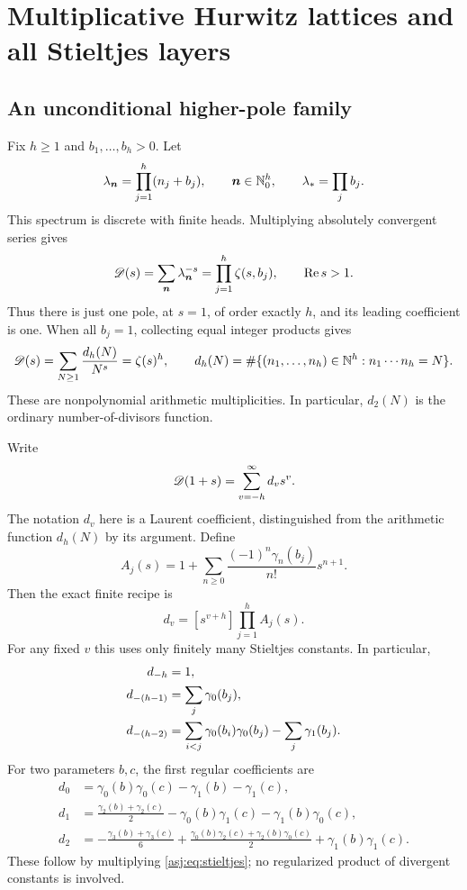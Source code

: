 \section{Multiplicative Hurwitz lattices and all Stieltjes layers}
\label{asj:sec:hurwitz}

\subsection{An unconditional higher-pole family}
Fix $h\ge1$ and $b_1,\ldots,b_h>0$. Let
\begin{equation}\label{asj:eq:lattice}
 \lambda_{\boldsymbol n}=\prod_{j=1}^h(n_j+b_j),
 \qquad \boldsymbol n\in\mathbb N_0^h,
 \qquad \lambda_* =\prod_jb_j.
\end{equation}
This spectrum is discrete with finite heads. Multiplying absolutely
convergent series gives
\begin{equation}\label{asj:eq:Dhurwitz}
 \mathscr D(s)=\sum_{\boldsymbol n}\lambda_{\boldsymbol n}^{-s}
              =\prod_{j=1}^h\zeta(s,b_j),\qquad \operatorname{Re} s>1.
\end{equation}
Thus there is just one pole, at $s=1$, of order exactly $h$, and its
leading coefficient is one. When all $b_j=1$, collecting equal integer
products gives
\[
 \mathscr D(s)=\sum_{N\ge1}\frac{d_h(N)}{N^s}=\zeta(s)^h,
 \qquad d_h(N)=\#\{(n_1,\ldots,n_h)\in\mathbb N^h:n_1\cdots n_h=N\}.
\]
These are nonpolynomial arithmetic multiplicities. In particular,
$d_2(N)$ is the ordinary number-of-divisors function.

Write
\begin{equation}\label{asj:eq:dcoeff}
 \mathscr D(1+s)=\sum_{v=-h}^{\infty}d_v s^v.
\end{equation}
The notation $d_v$ here is a Laurent coefficient, distinguished from the
arithmetic function $d_h(N)$ by its argument. Define
\[
 A_j(s)=1+\sum_{n\ge0}\frac{(-1)^n\gamma_n(b_j)}{n!}s^{n+1}.
\]
Then the exact finite recipe is
\begin{equation}\label{asj:eq:drecipe}
 d_v=[s^{v+h}]\prod_{j=1}^h A_j(s).
\end{equation}
For any fixed $v$ this uses only finitely many Stieltjes constants. In
particular,
\begin{align}
 d_{-h}&=1,\notag\\
 d_{-(h-1)}&=\sum_j\gamma_0(b_j),\label{asj:eq:dleading}\\
 d_{-(h-2)}&=\sum_{i<j}\gamma_0(b_i)\gamma_0(b_j)
                   -\sum_j\gamma_1(b_j).\notag
\end{align}
For two parameters $b,c$, the first regular coefficients are
\begin{align}
 d_0&=\gamma_0(b)\gamma_0(c)-\gamma_1(b)-\gamma_1(c),\label{asj:eq:d0}\\
 d_1&=\frac{\gamma_2(b)+\gamma_2(c)}2
             -\gamma_0(b)\gamma_1(c)-\gamma_1(b)\gamma_0(c),\label{asj:eq:d1}\\
 d_2&=-\frac{\gamma_3(b)+\gamma_3(c)}6
      +\frac{\gamma_0(b)\gamma_2(c)+\gamma_2(b)\gamma_0(c)}2
      +\gamma_1(b)\gamma_1(c).\label{asj:eq:d2}
\end{align}
These follow by multiplying \eqref{asj:eq:stieltjes}; no regularized product
of divergent constants is involved.

